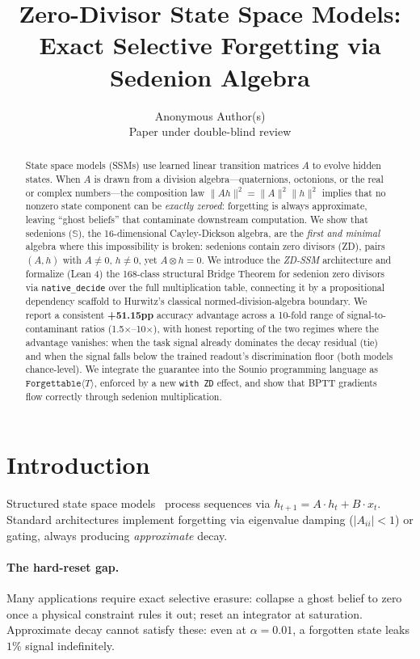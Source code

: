 \documentclass{article}
\title{Zero-Divisor State Space Models:\\Exact Selective Forgetting via Sedenion Algebra}
\author{%
  Anonymous Author(s) \\
  Paper under double-blind review%
}
\newcommand{\Forgettable}[1]{\texttt{Forgettable}\langle #1 \rangle}
\begin{document}
\maketitle


\begin{abstract}
State space models (SSMs) use learned linear transition matrices $A$ to evolve
hidden states. When $A$ is drawn from a division algebra---quaternions, octonions,
or the real or complex numbers---the composition law $\|Ah\|^2 = \|A\|^2 \|h\|^2$
implies that no nonzero state component can be \emph{exactly zeroed}: forgetting
is always approximate, leaving ``ghost beliefs'' that contaminate downstream computation.
We show that sedenions ($\mathbb{S}$), the 16-dimensional Cayley-Dickson algebra,
are the \emph{first and minimal} algebra where this impossibility is broken:
sedenions contain zero divisors (ZD), pairs $(A, h)$ with $A \neq 0$, $h \neq 0$,
yet $A \otimes h = 0$.
We introduce the \emph{ZD-SSM} architecture and formalize (Lean 4) the
168-class structural Bridge Theorem for sedenion zero divisors via
\texttt{native\_decide} over the full multiplication table, connecting it by
a propositional dependency scaffold to Hurwitz's classical
normed-division-algebra boundary.
We report a consistent \textbf{+51.15pp} accuracy advantage across a 10-fold
range of signal-to-contaminant ratios (1.5$\times$--10$\times$), with honest
reporting of the two regimes where the advantage vanishes: when the task signal
already dominates the decay residual (tie) and when the signal falls below the
trained readout's discrimination floor (both models chance-level).
We integrate the guarantee into the Sounio programming language as
$\Forgettable{T}$, enforced by a new \texttt{with ZD} effect, and show that
BPTT gradients flow correctly through sedenion multiplication.
\end{abstract}


\section{Introduction}

Structured state space models~\cite{gu2021efficiently,gu2023mamba}
process sequences via $h_{t+1} = A \cdot h_t + B \cdot x_t$.
Standard architectures implement forgetting via eigenvalue damping
($|A_{ii}| < 1$) or gating, always producing \emph{approximate} decay.

\paragraph{The hard-reset gap.}
Many applications require exact selective erasure: collapse a ghost belief
to zero once a physical constraint rules it out; reset an integrator at saturation.
Approximate decay cannot satisfy these: even at $\alpha = 0.01$, a forgotten
state leaks $1\%$ signal indefinitely.
\end{document}
